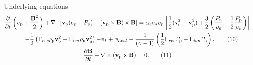 \documentclass[10pt,aspectratio=169,usenames,dvipsnames]{beamer}
\begin{document}
\begin{frame}{Underlying equations}
\begin{gather}
\frac{\partial}{\partial t} \left( e_{\text{p}} + \frac{\textbf{B}^2}{2} \right) + \nabla \cdot \left[ \textbf{v}_{\text{p}} ( e_{\text{p}} + P_{\text{p}}) -  (\textbf{v}_{\rm p} \times \textbf{B}) \times \textbf{B} \right]  =  \alpha _c \rho _{\text{n}} \rho _{\text{p}} \left[ \frac{1}{2} (\textbf{v}_{\text{n}} ^2 - \textbf{v}_{\text{p}} ^2)+ \frac{3}{2} \left(\frac{P_{\rm n}}{\rho_{\rm n}}-\frac{1}{2}\frac{P_{\rm p}}{\rho_{\rm p}}\right) \right] \nonumber \\ \hspace{0.5cm}- \frac{1}{2} \left( \Gamma _{rec} \rho _{\rm p} \textbf{v}_{\rm p} ^2 - \Gamma _{ion} \rho _{\rm n} \textbf{v}_{\rm n} ^2 \right) {- \phi_I + \phi_{heat}} -\frac{1}{ (\gamma-1)} \left( \frac{1}{2} \Gamma _{rec} P_{\rm p} -\Gamma _{ion} P_{\rm n} \right), \label{eqn:ep} \tag{10}\\
\frac{\partial \textbf{B}}{\partial t} - \nabla \times (\textbf{v}_{\text{p}} \times \textbf{B}) = 0.\tag{11}
\end{gather}
\end{frame}
\end{document}
